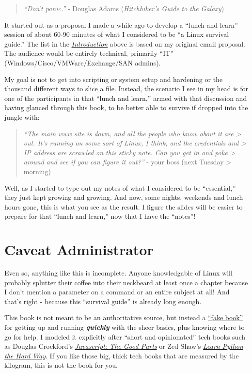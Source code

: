 \documentclass[10pt,]{book}
\numberwithin{figure}{chapter}
\begin{document}
\begin{quote}
\emph{``Don't panic.''} - Douglas Adams (\emph{Hitchhiker's Guide to the
Galaxy})
\end{quote}

It started out as a proposal I made a while ago to develop a ``lunch and
learn'' session of about 60-90 minutes of what I considered to be ``a
Linux survival guide.'' The list in the
\hyperref[introduction]{\emph{Introduction}} above is based on my
original email proposal. The audience would be entirely technical,
primarily ``IT'' (Windows/Cisco/VMWare/Exchange/SAN admins).

My goal is not to get into scripting or system setup and hardening or
the thousand different ways to slice a file. Instead, the scenario I see
in my head is for one of the participants in that ``lunch and learn,''
armed with that discussion and having glanced through this book, to be
better able to survive if dropped into the jungle with:

\begin{quote}
\emph{``The main www site is down, and all the people who know about it
are \textgreater{} out. It's running on some sort of Linux, I think, and
the credentials and \textgreater{} IP address are scrawled on this
sticky note. Can you get in and poke \textgreater{} around and see if
you can figure it out?''} - your boss (next Tuesday \textgreater{}
morning)
\end{quote}

Well, as I started to type out my notes of what I considered to be
``essential,'' they just kept growing and growing. And now, some nights,
weekends and lunch hours gone, this is what you see as the result. I
figure the slides will be easier to prepare for that ``lunch and
learn,'' now that I have the ``notes''!

\section{Caveat Administrator}\label{caveat-administrator}

Even so, anything like this is incomplete. Anyone knowledgable of Linux
will probably splutter their coffee into their neckbeard at least once a
chapter because I don't mention a parameter on a command or an entire
subject at all! And that's right - because this ``survival guide'' is
already long enough.

This book is not meant to be an authoritative source, but instead a
\href{https://en.wikipedia.org/wiki/Fake_book}{``fake book''} for
getting up and running \textbf{\emph{quickly}} with the sheer basics,
plus knowing where to go for help. I modeled it explicitly after ``short
and opinionated'' tech books such as Douglas Crockford's
\href{http://shop.oreilly.com/product/9780596517748.do}{\emph{Javascript:
The Good Parts}} or Zed Shaw's
\href{http://learnpythonthehardway.org/}{\emph{Learn Python the Hard
Way}}. If you like those big, thick tech books that are measured by the
kilogram, this is not the book for you.
\end{document}
